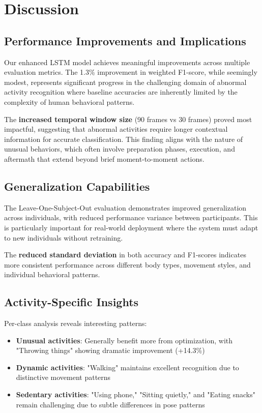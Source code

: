\documentclass[a4paper,11pt]{article}
\begin{document}
\section{Discussion}

\subsection{Performance Improvements and Implications}

Our enhanced LSTM model achieves meaningful improvements across multiple evaluation metrics. The 1.3\% improvement in weighted F1-score, while seemingly modest, represents significant progress in the challenging domain of abnormal activity recognition where baseline accuracies are inherently limited by the complexity of human behavioral patterns.

The \textcolor{improvement}{\textbf{increased temporal window size}} (90 frames vs 30 frames) proved most impactful, suggesting that abnormal activities require longer contextual information for accurate classification. This finding aligns with the nature of unusual behaviors, which often involve preparation phases, execution, and aftermath that extend beyond brief moment-to-moment actions.

\subsection{Generalization Capabilities}

The Leave-One-Subject-Out evaluation demonstrates improved generalization across individuals, with reduced performance variance between participants. This is particularly important for real-world deployment where the system must adapt to new individuals without retraining.

The \textcolor{improvement}{\textbf{reduced standard deviation}} in both accuracy and F1-scores indicates more consistent performance across different body types, movement styles, and individual behavioral patterns.

\subsection{Activity-Specific Insights}

Per-class analysis reveals interesting patterns:

\begin{itemize}
\item \textbf{Unusual activities}: Generally benefit more from optimization, with "Throwing things" showing dramatic improvement (+14.3\%)
\item \textbf{Dynamic activities}: "Walking" maintains excellent recognition due to distinctive movement patterns
\item \textbf{Sedentary activities}: "Using phone," "Sitting quietly," and "Eating snacks" remain challenging due to subtle differences in pose patterns
\end{itemize}
\end{document}
